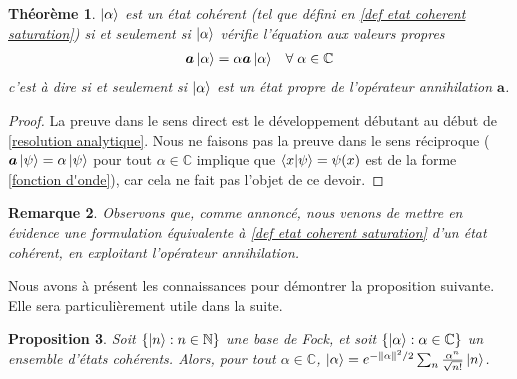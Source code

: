\documentclass[11pt,oneside,a4paper]{article}
\newtheorem{theorem}{Théorème}[section]
\newtheorem{property}[theorem]{Proposition}
\newtheorem{remark}[theorem]{Remarque}
\begin{document}
\begin{theorem}
  $\ket{\alpha}$ est un état cohérent (tel que défini en \ref{def etat coherent saturation}) si et seulement si $\ket{\alpha}$ vérifie l'équation aux valeurs propres
  \begin{align}
    \label{etat coherent}
    \bm{a}\ket{\alpha} &= \alpha\bm{a}\ket{\alpha} &\forall\; \alpha\in\mathbb{C}
  \end{align}
  c'est à dire si et seulement si $\ket{\alpha}$ est un état propre de l'opérateur annihilation $\bm{a}$.
\end{theorem}

\begin{proof}
  La preuve dans le sens direct est le développement débutant au début de \ref{resolution analytique}. Nous ne faisons pas la preuve dans le sens réciproque ($\bm{a}\ket{\psi}=\alpha\ket{\psi}$ pour tout $\alpha\in\mathbb{C}$ implique que $\braket{x}{\psi}=\psi(x)$ est de la forme \ref{fonction d'onde}), car cela ne fait pas l'objet de ce devoir.
\end{proof}

\begin{remark}
  Observons que, comme annoncé, nous venons de mettre en évidence une formulation équivalente à \ref{def etat coherent saturation} d'un état cohérent, en exploitant l'opérateur annihilation.
\end{remark}

Nous avons à présent les connaissances pour démontrer la proposition suivante. Elle sera particulièrement utile dans la suite.

\begin{property}
  \label{coherent in fock}
  Soit $\left\{\ket{n} : n\in\mathbb{N}\right\}$ une base de Fock, et soit $\left\{\ket{\alpha} : \alpha\in\mathbb{C}\right\}$ un ensemble d'états cohérents. Alors, pour tout $\alpha\in\mathbb{C}$, $\ket{\alpha} = e^{-\norm{\alpha}^2/2}\sum_n \frac{\alpha^n}{\sqrt{n!}}\ket{n}$.
\end{property}
\end{document}
